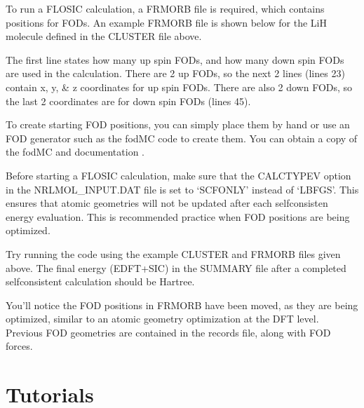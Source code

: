 \documentclass[letterpaper,10pt,english,openany,oneside]{sphinxmanual}
\begin{document}
\sphinxAtStartPar
To run a FLOSIC calculation, a FRMORB file is required, which contains positions for FODs. An example FRMORB file is shown below for the LiH molecule defined in the CLUSTER file above.

\begin{sphinxVerbatim}[commandchars=\\\{\}]
  
  
  
  
  
\end{sphinxVerbatim}

\sphinxAtStartPar
The first line states how many up spin FODs, and how many down spin FODs are used in the calculation. There are 2 up FODs, so the next 2 lines (lines 2\sphinxhyphen{}3)
contain x, y, \& z coordinates for up spin FODs. There are also 2 down FODs, so the last 2 coordinates are for down spin FODs (lines 4\sphinxhyphen{}5).

\sphinxAtStartPar
To create starting FOD positions, you can simply place them by hand or use an FOD generator such as the fodMC code to create them.
You can obtain a copy of the fodMC and documentation .

\sphinxAtStartPar
Before starting a FLOSIC calculation, make sure that the CALCTYPEV option in the NRLMOL\_INPUT.DAT file is set to ‘SCF\sphinxhyphen{}ONLY’ instead of ‘LBFGS’.
This ensures that atomic geometries will not be updated after each self\sphinxhyphen{}consisten energy evaluation. This is recommended practice when FOD positions are being optimized.

\sphinxAtStartPar
Try running the code using the example CLUSTER and FRMORB files given above. The final energy (EDFT+SIC) in the SUMMARY file after a completed self\sphinxhyphen{}consistent calculation should be  Hartree.

\sphinxAtStartPar
You’ll notice the FOD positions in FRMORB have been moved, as they are being optimized, similar to an atomic geometry optimization at the DFT level.
Previous FOD geometries are contained in the records file, along with FOD forces.

\sphinxstepscope


\chapter{Tutorials}
\label{\detokenize{tutorials/tuttoc:tutorials}}\label{\detokenize{tutorials/tuttoc::doc}}
\sphinxstepscope
\end{document}

